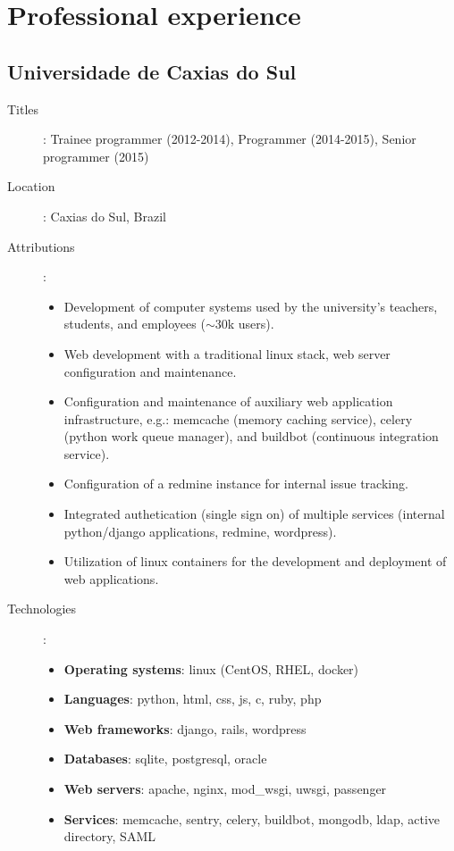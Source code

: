\section*{Professional experience}
\subsection*{Universidade de Caxias do Sul}

\begin{description}
    \item[Titles]:
        Trainee programmer (2012-2014), Programmer (2014-2015), Senior
        programmer (2015)
    \item[Location]: Caxias do Sul, Brazil
    \item[Attributions]:
        \begin{itemize}
            \item
                Development of computer systems used by the university's
                teachers, students, and employees ($\sim$30k users).
            \item
                Web development with a traditional linux stack, web server
                configuration and maintenance.
            \item
                Configuration and maintenance of auxiliary web application
                infrastructure, e.g.: memcache (memory caching service), celery
                (python work queue manager), and buildbot (continuous
                integration service).
            \item
                Configuration of a redmine instance for internal issue
                tracking.
            \item
                Integrated authetication (single sign on) of multiple services
                (internal python/django applications, redmine, wordpress).
            \item
                Utilization of linux containers for the development and
                deployment of web applications.
        \end{itemize}
    \item[Technologies]:
        \begin{itemize}
            \item \textbf{Operating systems}: linux (CentOS, RHEL, docker)
            \item \textbf{Languages}: python, html, css, js, c, ruby, php
            \item \textbf{Web frameworks}: django, rails, wordpress
            \item \textbf{Databases}: sqlite, postgresql, oracle
            \item \textbf{Web servers}:
                apache, nginx, mod\_wsgi, uwsgi, passenger
            \item \textbf{Services}:
                memcache, sentry, celery, buildbot, mongodb, ldap, active
                directory, SAML
        \end{itemize}
\end{description}

